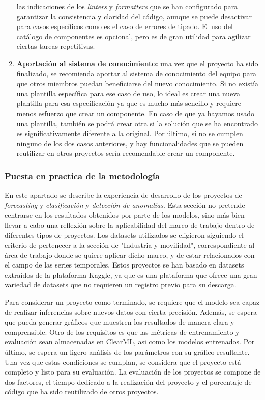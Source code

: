 \begin{enumerate}
    las indicaciones de los \textit{linters} y \textit{formatters} que se han configurado
    para garantizar la consistencia y claridad del código, aunque se puede desactivar
    para casos específicos como es el caso de errores de tipado. El uso del catálogo
    de componentes es opcional, pero es de gran utilidad para agilizar ciertas tareas
    repetitivas.
    \item \textbf{Aportación al sistema de conocimiento:} una vez que el proyecto
    ha sido finalizado, se recomienda aportar al sistema de conocimiento del equipo
    para que otros miembros puedan beneficiarse del nuevo conocimiento. Si
    no existía una plantilla específica para ese caso de uso, lo ideal es crear
    una nueva plantilla para esa especificación ya que es mucho más sencillo
    y requiere menos esfuerzo que crear un componente. En caso de que ya hayamos
    usado una plantilla, también se podrá crear otra si la solución que
    se ha encontrado es significativamente diferente a la original. Por último,
    si no se cumplen ninguno de los dos casos anteriores, y hay funcionalidades
    que se pueden reutilizar en otros proyectos sería recomendable crear un
    componente.
\end{enumerate}

\subsubsection{Puesta en practica de la metodología}
En este apartado se describe la experiencia de desarrollo de
los proyectos de \textit{forecasting} y \textit{clasificación} y \textit{detección de anomalías}.
Esta sección no pretende centrarse en los resultados obtenidos por parte de los modelos, sino
más bien llevar a cabo una reflexión sobre la aplicabilidad del marco de trabajo
dentro de diferentes tipos de proyectos. Los datasets utilizados se eligieron siguiendo el criterio de 
pertenecer a la sección de "Industria y movilidad", correspondiente al área de trabajo donde 
se quiere aplicar dicho marco, y de estar relacionados con el campo 
de las series temporales. Estos proyectos se han basado en datasets extraídos de la plataforma Kaggle, 
ya que es una plataforma que ofrece una gran variedad de datasets que no requieren un registro previo para su descarga.\medskip

Para considerar un proyecto como terminado, se requiere que el modelo sea capaz de realizar inferencias 
sobre nuevos datos con cierta precisión. Además, se espera que pueda generar gráficos que muestren los 
resultados de manera clara y comprensible. Otro de los requisitos es que las métricas de entrenamiento
y evaluación sean almacenadas en ClearML, asi como los modelos entrenados. Por último, se espera un ligero
análisis de los parámetros con su gráfico resultante. Una vez que estas condiciones se cumplan, 
se considera que el proyecto está completo y listo para su evaluación. La evaluación de los proyectos
se compone de dos factores, el tiempo dedicado a la realización del proyecto y el porcentaje de código
que ha sido reutilizado de otros proyectos.

